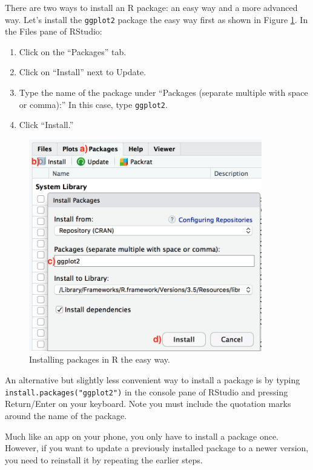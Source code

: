\documentclass[]{book}
\providecommand{\tightlist}{%
  \setlength{\itemsep}{0pt}\setlength{\parskip}{0pt}}
\begin{document}
There are two ways to install an R package: an easy way and a more advanced way.  Let's install the \texttt{ggplot2} package the easy way first as shown in Figure \ref{fig:easy-way-install}. In the Files pane of RStudio:

\begin{enumerate}
\def\labelenumi{\alph{enumi})}
\tightlist
\item
  Click on the ``Packages'' tab.
\item
  Click on ``Install'' next to Update.
\item
  Type the name of the package under ``Packages (separate multiple with space or comma):'' In this case, type \texttt{ggplot2}.
\item
  Click ``Install.''
\end{enumerate}

\begin{figure}

{\centering \includegraphics[width=4in]{images/install_packages_easy_way} 

}

\caption{Installing packages in R the easy way.}\label{fig:easy-way-install}
\end{figure}

An alternative but slightly less convenient way to install a package is by typing \texttt{install.packages("ggplot2")} in the console pane of RStudio and pressing Return/Enter on your keyboard. Note you must include the quotation marks around the name of the package.

Much like an app on your phone, you only have to install a package once. However, if you want to update a previously installed package to a newer version, you need to reinstall it by repeating the earlier steps.
\end{document}
